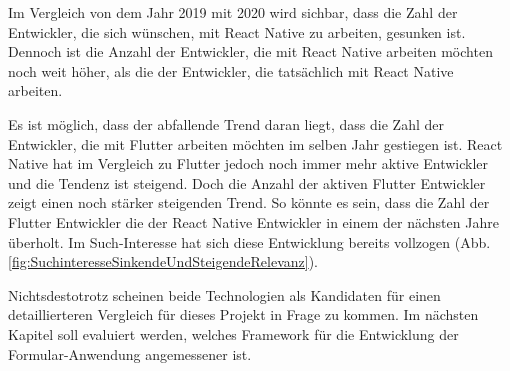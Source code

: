 Im Vergleich von dem Jahr 2019 mit 2020 wird sichbar, dass die Zahl der Entwickler, die sich wünschen, mit React Native zu arbeiten, gesunken ist. Dennoch ist die Anzahl der Entwickler, die mit React Native arbeiten möchten noch weit höher, als die der Entwickler, die tatsächlich mit React Native arbeiten.

Es ist möglich, dass der abfallende Trend daran liegt, dass die Zahl der Entwickler, die mit Flutter arbeiten möchten im selben Jahr gestiegen ist. React Native hat im Vergleich zu Flutter jedoch noch immer mehr aktive Entwickler und die Tendenz ist steigend. Doch die Anzahl der aktiven Flutter Entwickler zeigt einen noch stärker steigenden Trend. So könnte es sein, dass die Zahl der Flutter Entwickler die der React Native Entwickler in einem der nächsten Jahre überholt. Im Such-Interesse hat sich diese Entwicklung bereits vollzogen (Abb. \ref{fig:SuchinteresseSinkendeUndSteigendeRelevanz}).

Nichtsdestotrotz scheinen beide Technologien als Kandidaten für einen detaillierteren Vergleich für dieses Projekt in Frage zu kommen. Im nächsten Kapitel soll evaluiert werden, welches Framework für die Entwicklung der Formular-Anwendung angemessener ist.



